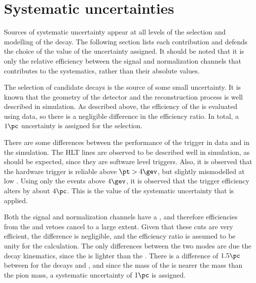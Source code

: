 \section{Systematic uncertainties}
\label{sec:dsphi:syst}

Sources of systematic uncertainty appear at all levels of the selection and modelling of the decay.
The following section lists each contribution and defends the choice of the value of the
uncertainty assigned.
It should be noted that it is only the relative efficiency between the signal and normalization
channels that contributes to the systematics, rather than their absolute values.

The selection of candidate \btodsphi decays is the source of some small uncertainty.
It is known that the geometry of the detector and the reconstruction process is well described in
simulation.
As described above, the efficiency of the \bdt is evaluated using data, so there is a negligible
difference in the efficiency ratio.
In total, a $1\pc$ uncertainty is assigned for the selection.

There are some differences between the performance of the trigger in data and in the simulation.
The HLT lines are observed to be described well in simulation, as should be expected, since they
are software level triggers.
Also, it is observed that the \lone hardware trigger is reliable above $\pt>4\gev$, but slightly
mismodelled at low \pt.
Using only the events above $4\gev$, it is observed that the trigger efficiency alters by about
$4\pc$.
This is the value of the systematic uncertainty that is applied.

Both the signal and normalization channels have a \dstokkpi, and therefore efficiencies from the \Dp and
\Lc vetoes cancel to a large extent.
Given that these cuts are very efficient, the difference is negligible, and the efficiency ratio is
assumed to be unity for the calculation.
The only differences between the two modes are due the decay kinematics, since the \phii is lighter
than the \Dz.
There is a difference of $1.5\pc$ between  for the decays \decay{\Bsb}{\Dsp\pim} and
\btodsd, and
since the mass of the \phii is nearer the \Dz mass than the pion mass, a systematic uncertainty of
$1\pc$ is assigned.


